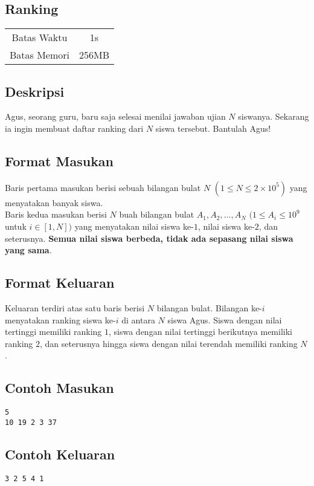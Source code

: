 \documentclass{article}
\begin{document}
\begin{center}
    \section*{Ranking} %

    \begin{tabular}{ | c c | }
        \hline
        Batas Waktu  & 1s \\    %
        Batas Memori & 256MB \\  %
        \hline
    \end{tabular}
\end{center}

\subsection*{Deskripsi}
Agus, seorang guru, baru saja selesai menilai jawaban ujian $N$ siswanya. Sekarang ia ingin membuat daftar ranking dari $N$ siswa tersebut. Bantulah Agus!

\subsection*{Format Masukan}
Baris pertama masukan berisi sebuah bilangan bulat $N$ $(1 \leq N \leq 2\times10^5)$ yang menyatakan banyak siswa. \\
Baris kedua masukan berisi $N$ buah bilangan bulat $A_1, A_2, ..., A_N$ $(1 \leq A_i \leq 10^9$ untuk $i \in [1, N])$ yang menyatakan nilai siswa ke-$1$, nilai siswa ke-$2$, dan seterusnya. \textbf{Semua nilai siswa berbeda, tidak ada sepasang nilai siswa yang sama}.

\subsection*{Format Keluaran}
Keluaran terdiri atas satu baris berisi $N$ bilangan bulat. Bilangan ke-$i$ menyatakan ranking siswa ke-$i$ di antara $N$ siswa Agus. Siswa dengan nilai tertinggi memiliki ranking $1$, siswa dengan nilai tertinggi berikutnya memiliki ranking $2$, dan seterusnya hingga siswa dengan nilai terendah memiliki ranking $N$.

\begin{multicols}{2}
\subsection*{Contoh Masukan}
\begin{lstlisting}
5
10 19 2 3 37
\end{lstlisting}
\null
\columnbreak
\subsection*{Contoh Keluaran}
\begin{lstlisting}
3 2 5 4 1
\end{lstlisting}
\vfill
\null
\end{multicols}
\end{document}
